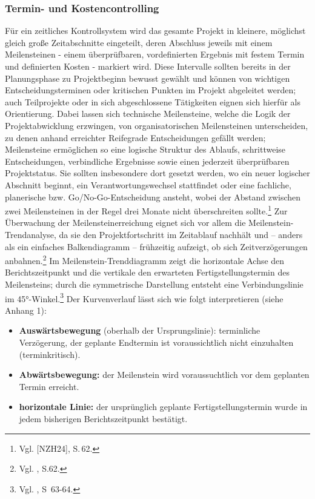 \documentclass[
    12pt, 
    a4paper,
    ]{scrartcl} %
\begin{document}
\subsubsection{Termin- und Kostencontrolling}
Für ein zeitliches Kontrollsystem wird das gesamte Projekt in kleinere, möglichst gleich große Zeitabschnitte eingeteilt, deren Abschluss jeweils mit einem Meilensteinen - einem überprüfbaren, vordefinierten Ergebnis mit festem Termin und definierten Kosten - markiert wird. Diese Intervalle sollten bereits in der Planungsphase zu Projektbeginn bewusst gewählt und können von wichtigen Entscheidungsterminen oder kritischen Punkten im Projekt abgeleitet werden; auch Teilprojekte oder in sich abgeschlossene Tätigkeiten eignen sich hierfür als Orientierung. Dabei lassen sich technische Meilensteine, welche die Logik der Projektabwicklung erzwingen, von organisatorischen Meilensteinen unterscheiden, zu denen anhand erreichter Reifegrade Entscheidungen gefällt werden; Meilensteine ermöglichen so eine logische Struktur des Ablaufs, schrittweise Entscheidungen, verbindliche Ergebnisse sowie einen jederzeit überprüfbaren Projektstatus. Sie sollten insbesondere dort gesetzt werden, wo ein neuer logischer Abschnitt beginnt, ein Verantwortungswechsel stattfindet oder eine fachliche, planerische bzw. Go/No-Go-Entscheidung ansteht, wobei der Abstand zwischen zwei Meilensteinen in der Regel drei Monate nicht überschreiten sollte.\footnote{Vgl. [NZH24], S.\,62.} 
Zur Überwachung der Meilensteinerreichung eignet sich vor allem die Meilenstein-Trendanalyse, da sie den Projektfortschritt im Zeitablauf nachhält und – anders als ein einfaches Balkendiagramm – frühzeitig aufzeigt, ob sich Zeitverzögerungen anbahnen.\footnote{Vgl. \cite{Nobach_Projektcontrolling}, S.62.} Im Meilenstein-Trenddiagramm zeigt die horizontale Achse den Berichtszeitpunkt und die vertikale den erwarteten Fertigstellungstermin des Meilensteins; durch die symmetrische Darstellung entsteht eine Verbindungslinie im 45°-Winkel.\footnote{Vgl. \cite{Nobach_Projektcontrolling}, S~63-64.}
Der Kurvenverlauf lässt sich wie folgt interpretieren (siehe Anhang 1):
\begin{itemize}
    \setlength\itemsep{0.4\baselineskip}
    \setlength\parskip{0pt}
    \setlength\parsep{0pt}
    \item \textbf{Auswärtsbewegung} (oberhalb der Ursprungslinie): terminliche Verzögerung, der geplante Endtermin ist voraussichtlich nicht einzuhalten (terminkritisch).
    \item \textbf{Abwärtsbewegung:} der Meilenstein wird voraussuchtlich vor dem geplanten Termin erreicht.
    \item \textbf{horizontale Linie:} der ursprünglich geplante Fertigstellungstermin wurde in jedem bisherigen Berichtszeitpunkt bestätigt.
\end{itemize}
\end{document}

